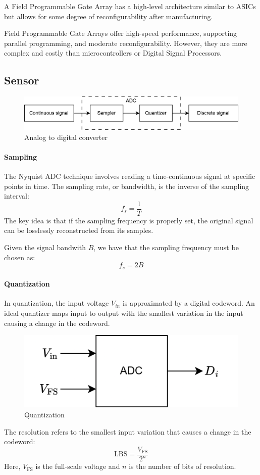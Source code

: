 \begin{definition}
    A Field Programmable Gate Array has a high-level architecture similar to ASICs but allows for some degree of reconfigurability after manufacturing.
\end{definition}
Field Programmable Gate Arrays offer high-speed performance, supporting parallel programming, and moderate reconfigurability. 
However, they are more complex and costly than microcontrollers or Digital Signal Processors.












\subsection{Sensor}
\begin{figure}[H]
    \centering
    \includegraphics[width=0.75\linewidth]{images/adc.png}
    \caption{Analog to digital converter}
\end{figure}


\paragraph*{Sampling}
The Nyquist ADC technique involves reading a time-continuous signal at specific points in time. 
The sampling rate, or bandwidth, is the inverse of the sampling interval:
\[f_s=\dfrac{1}{T}\]
The key idea is that if the sampling frequency is properly set, the original signal can be losslessly reconstructed from its samples.
\begin{theorem}
    Given the signal bandwith $B$, we have that the sampling frequency must be chosen as:
    \[f_s=2B\]
\end{theorem}

\paragraph*{Quantization}
In quantization, the input voltage $V_{in}$ is approximated by a digital codeword. 
An ideal quantizer maps input to output with the smallest variation in the input causing a change in the codeword.
\begin{figure}[H]
    \centering
    \includegraphics[width=0.5\linewidth]{images/quant.png}
    \caption{Quantization}
\end{figure}
The resolution refers to the smallest input variation that causes a change in the codeword:
\[\text{LBS}=\dfrac{V_{\text{FS}}}{2^n}\]
Here, $V_{\text{FS}}$ is the full-scale voltage and $n$ is the number of bits of resolution.

